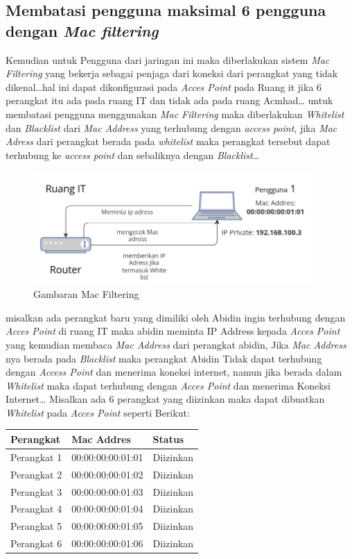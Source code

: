 \documentclass[a4paper, 12pt]{article}
\begin{document}
\subsection{Membatasi pengguna maksimal 6 pengguna dengan \textit{Mac filtering}}
Kemudian untuk Pengguna dari jaringan ini maka diberlakukan sistem \textit{Mac Filtering} yang bekerja sebagai penjaga dari koneksi dari perangkat yang tidak dikenal\dots hal ini dapat dikonfigurasi pada \textit{Acces Point} pada Ruang it jika 6 perangkat itu ada pada ruang IT dan tidak ada pada ruang Acmhad\dots \newline
untuk membatasi pengguna menggunakan \textit{Mac Filtering} maka diberlakukan \textit{Whitelist} dan \textit{Blacklist} dari \textit{Mac Address} yang terhubung dengan \textit{access point}, jika \textit{Mac Adress} dari perangkat berada pada \textit{whitelist} maka perangkat tersebut dapat terhubung ke \textit{access point} dan sebaliknya dengan \textit{Blacklist}\dots
\begin{figure}[H]
  \begin{center}
    \includegraphics[width=0.95\textwidth]{images/gambar2.png}
  \end{center}
  \caption{Gambaran Mac Filtering}\label{fig:macfiltering}
\end{figure}
misalkan ada perangkat baru yang dimiliki oleh Abidin ingin terhubung dengan \textit{Acces Point} di ruang IT maka abidin meminta IP Address kepada \textit{Acces Point} yang kemudian membaca \textit{Mac Address} dari perangkat abidin, Jika \textit{Mac Address} nya berada pada \textit{Blacklist} maka perangkat Abidin Tidak dapat terhubung dengan \textit{Access Point} dan menerima koneksi internet, namun jika berada dalam \textit{Whitelist} maka dapat terhubung dengan \textit{Acces Point} dan menerima Koneksi Internet\dots
Misalkan ada 6 perangkat yang diizinkan maka dapat dibuatkan \textit{Whitelist} pada \textit{Acces Point} seperti Berikut:
\begin{table}[H]
\begin{tabular}{|l|l|l|}
\hline
Perangkat   & Mac Addres        & Status    \\ \hline
Perangkat 1 & 00:00:00:00:01:01 & Diizinkan \\ \hline
Perangkat 2 & 00:00:00:00:01:02 & Diizinkan \\ \hline
Perangkat 3 & 00:00:00:00:01:03 & Diizinkan \\ \hline
Perangkat 4 & 00:00:00:00:01:04 & Diizinkan \\ \hline
Perangkat 5 & 00:00:00:00:01:05 & Diizinkan \\ \hline
Perangkat 6 & 00:00:00:00:01:06 & Diizinkan \\ \hline
\end{tabular}
\end{table}
\end{document}
